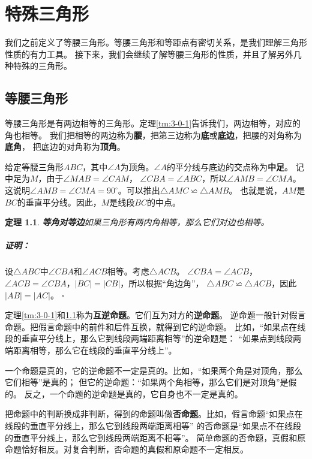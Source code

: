 \documentclass[12pt,UTF8]{ctexbook}
\newtheorem{tm}{定理}[section]
\newenvironment{proof2}{\paragraph{\textbf{证明：}}}{\hfill$\square$}
\begin{document}
\chapter{特殊三角形}
我们之前定义了等腰三角形。等腰三角形和等距点有密切关系，是我们理解三角形性质的有力工具。
接下来，我们会继续了解等腰三角形的性质，并且了解另外几种特殊的三角形。

\section{等腰三角形}
等腰三角形是有两边相等的三角形。定理\ref{tm:3-0-1}告诉我们，两边相等，对应的角也相等。
我们把相等的两边称为\textbf{腰}，把第三边称为\textbf{底}或\textbf{底边}，把腰的对角称为\textbf{底角}，
把底边的对角称为\textbf{顶角}。

给定等腰三角形$ABC$，其中$\angle A$为顶角。$\angle A$的平分线与底边的交点称为\textbf{中足}。
记中足为$M$，由于$\angle MAB = \angle CAM$，
$\angle CBA = \angle ABC$，所以$\angle AMB = \angle CMA$。
这说明$\angle AMB = \angle CMA = 90^\circ$。可以推出$\triangle AMC \backsimeq \triangle AMB$。
也就是说，$AM$是$BC$的垂直平分线。因此，$M$是线段$BC$的中点。

\begin{tm}{\textbf{等角对等边}}\label{tm:4-0-0}
    如果三角形有两内角相等，那么它们对边也相等。
\end{tm}
\begin{proof2}
    设$\triangle ABC$中$\angle CBA$和$\angle ACB$相等。考虑$\triangle ACB$。
    $\angle CBA = \angle ACB$，$\angle ACB = \angle CBA$，$|BC| = |CB|$，所以根据“角边角”，
    $\triangle ABC \backsimeq \triangle ACB$，因此$|AB| = |AC|$。
\end{proof2}

定理\ref{tm:3-0-1}和\ref{tm:4-0-0}称为\textbf{互逆命题}。它们互为对方的\textbf{逆命题}。
逆命题一般针对假言命题。把假言命题中的前件和后件互换，就得到它的逆命题。
比如，“如果点在线段的垂直平分线上，那么它到线段两端距离相等”的逆命题是：
“如果点到线段两端距离相等，那么它在线段的垂直平分线上”。

一个命题是真的，它的逆命题不一定是真的。比如，“如果两个角是对顶角，那么它们相等”是真的；
但它的逆命题：“如果两个角相等，那么它们是对顶角”是假的。
反之，一个命题的逆命题是真的，它自身也不一定是真的。

把命题中的判断换成非判断，得到的命题叫做\textbf{否命题}。比如，假言命题“如果点在线段的垂直平分线上，那么它到线段两端距离相等”
的否命题是“如果点不在线段的垂直平分线上，那么它到线段两端距离不相等”。
简单命题的否命题，真假和原命题恰好相反。对复合判断，否命题的真假和原命题不一定相反。
\end{document}
